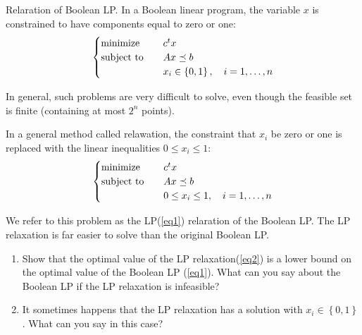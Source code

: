 \begin{problem}[4.15]
    Relaration of Boolean LP. In a Boolean linear program, the variable $x$ is constrained to have components equal to zero or one:\begin{equation}\label{eq1}
        \begin{cases}
            \operatorname{minimize} \quad &c^tx \\
            \operatorname{subject\ to} \quad &Ax \preceq b\\
            &x_i \in \left\{0, 1\right\}, \quad i = 1, \dots, n
        \end{cases}
    \end{equation}

    In general, such problems are very difficult to solve, even though the feasible set is finite (containing at most $2^n$ points).

    In a general method called relawation, the constraint that $x_i$ be zero or one is replaced with the linear inequalities $0 \le x_i \le 1$:\begin{equation}\label{eq2}
        \begin{cases}
            \operatorname{minimize} \quad &c^tx \\
            \operatorname{subject\ to} \quad &Ax \preceq b\\
            &0 \le x_i \le 1, \quad i = 1, \dots, n
        \end{cases}
    \end{equation}

    We refer to this problem as the LP(\ref{eq1}) relaration of the Boolean LP. The LP relaxation is far easier to solve than the original Boolean LP.
    \begin{enumerate}
        \item Show that the optimal value of the LP relaxation(\ref{eq2}) is a lower bound on the optimal value of the Boolean LP (\ref{eq1}). What can you say about the Boolean LP if the LP relaxation is infeasible?
        \item It sometimes happens that the LP relaxation has a solution with $x_i \in \left\{0, 1\right\}$. What can you say in this case?
    \end{enumerate}
\end{problem}

